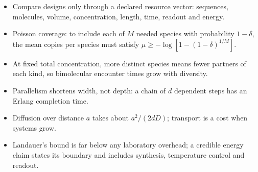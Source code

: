 \begin{KeyIdeas}
\begin{itemize}\setlength{\itemsep}{2pt}
\item Compare designs only through a declared resource vector: sequences,
molecules, volume, concentration, length, time, readout and energy.
\item Poisson coverage: to include each of $M$ needed species with probability
$1-\delta$, the mean copies per species must satisfy
$\mu\ge-\log[1-(1-\delta)^{1/M}]$.
\item At fixed total concentration, more distinct species means fewer partners of
each kind, so bimolecular encounter times grow with diversity.
\item Parallelism shortens width, not depth: a chain of $d$ dependent steps has an
Erlang completion time.
\item Diffusion over distance $a$ takes about $a^2/(2dD)$; transport is a cost
when systems grow.
\item Landauer's bound is far below any laboratory overhead; a credible energy
claim states its boundary and includes synthesis, temperature control and
readout.
\end{itemize}
\end{KeyIdeas}

